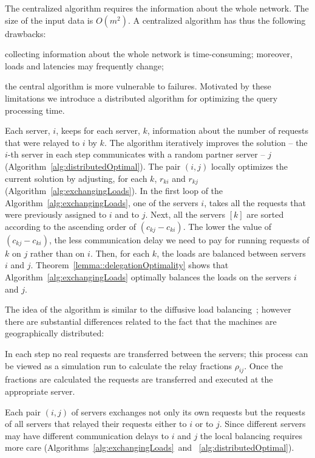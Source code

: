 \documentclass[11pt]{article}
\begin{document}
The centralized algorithm requires the information about the whole network. The size of the input data is $O(m^{2})$. A centralized algorithm has thus the following drawbacks:
\begin{inparaenum}[(i)] 
\item collecting information about the whole network is time-consuming; moreover, loads and latencies may frequently change;
\item the central algorithm is more vulnerable to failures. 
Motivated by these limitations we introduce a distributed algorithm for optimizing the query processing time.
\end{inparaenum}



Each server, $i$, keeps for each server, $k$, information about the number of requests that were relayed to $i$ by $k$. The algorithm iteratively improves the solution -- the $i$-th server in each step communicates with a random partner server -- $j$ (Algorithm~\ref{alg:distributedOptimal}). The pair $(i,j)$ locally optimizes the current solution by adjusting, for each $k$, $r_{ki}$ and $r_{kj}$ (Algorithm~\ref{alg:exchangingLoads}). 
In the first loop of the Algorithm~\ref{alg:exchangingLoads}, one of the servers $i$, takes all the requests that were previously assigned to $i$ and to $j$. Next, all the servers $[k]$ are sorted according to the ascending order of $(c_{kj} - c_{ki})$. The lower the value of $(c_{kj} - c_{ki})$, the less communication delay we need to pay for running requests of $k$ on $j$ rather than on $i$. Then, for each $k$, the loads are balanced between servers $i$ and $j$.  Theorem~\ref{lemma::delegationOptimality} shows that Algorithm~\ref{alg:exchangingLoads} 
optimally balances the loads on the servers $i$ and $j$.



The idea of the algorithm is similar to the diffusive load balancing~\cite{conf/ipps/AdolphsB12, Ackermann:2009:DAQ:1583991.1584046, Berenbrink:2011:DSL:2133036.2133152}; however there are substantial differences related to the fact that the machines are geographically distributed: \begin{inparaenum}[(i)] 
\item In each step no real requests are transferred between the servers; this process can be viewed as a simulation run to calculate the relay fractions $\rho_{ij}$. Once the fractions are calculated the requests are transferred and executed at the appropriate server. 
\item Each pair $(i, j)$ of servers exchanges not only its own requests but the requests of all servers that relayed their requests either to $i$ or to $j$. Since different servers may have different 
communication delays to $i$ and $j$ the local balancing requires more care (Algorithms~\ref{alg:exchangingLoads}~and ~\ref{alg:distributedOptimal}).
\end{inparaenum}
\end{document}
